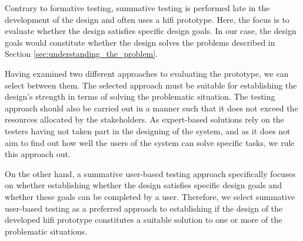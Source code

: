 Contrary to formative testing, summative testing is performed late in the development of the design and often uses a hifi prototype.
Here, the focus is to evaluate whether the design satisfies specific design goals. \cite{dumasAndFox_formative_usability_testing}
In our case, the design goals would constitute whether the design solves the problems described in Section \ref{sec:understanding_the_problem}.


Having examined two different approaches to evaluating the prototype, we can select between them.
The selected approach must be suitable for establishing the design's strength in terms of solving the problematic situation. 
The testing approach should also be carried out in a manner such that it does not exceed the resources allocated by the stakeholders. 
As expert-based solutions rely on the testers having not taken part in the designing of the system, and as it does not aim to find out how well the users of the system can solve specific tasks, we rule this approach out.

On the other hand, a summative user-based testing approach specifically focuses on whether establishing whether the design satisfies specific design goals and whether these goals can be completed by a user. 
Therefore, we select summative user-based testing as a preferred approach to establishing if the design of the developed hifi prototype constitutes a suitable solution to one or more of the problematic situations. 

